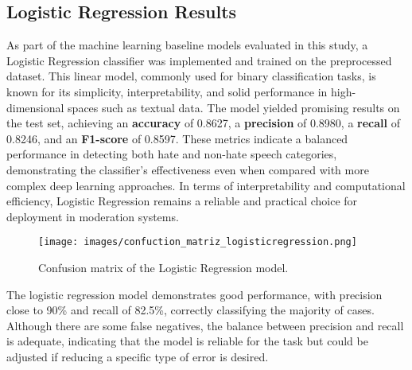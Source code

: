 \subsection{Logistic Regression Results}
\label{sec:logistic_regression_results}

As part of the machine learning baseline models evaluated in this study, a Logistic Regression classifier was implemented and trained on the preprocessed dataset. This linear model, commonly used for binary classification tasks, is known for its simplicity, interpretability, and solid performance in high-dimensional spaces such as textual data. The model yielded promising results on the test set, achieving an \textbf{accuracy} of 0.8627, a \textbf{precision} of 0.8980, a \textbf{recall} of 0.8246, and an \textbf{F1-score} of 0.8597. These metrics indicate a balanced performance in detecting both hate and non-hate speech categories, demonstrating the classifier's effectiveness even when compared with more complex deep learning approaches. In terms of interpretability and computational efficiency, Logistic Regression remains a reliable and practical choice for deployment in moderation systems.

\begin{figure}[H]
    \centering
    \texttt{[image: images/confuction\_matriz\_logisticregression.png]}
    \caption{Confusion matrix of the Logistic Regression model.}
    \label{fig:confusion_matrix_logistic_regression}
\end{figure}

The logistic regression model demonstrates good performance, with precision close to 90\% and recall of 82.5\%, correctly classifying the majority of cases. Although there are some false negatives, the balance between precision and recall is adequate, indicating that the model is reliable for the task but could be adjusted if reducing a specific type of error is desired.

